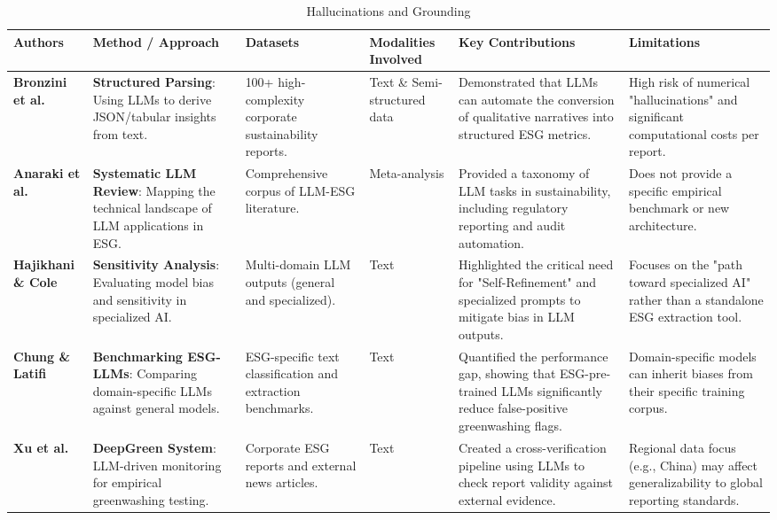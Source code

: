 \begin{landscape}
\begin{table}[p]
\centering
\caption{Hallucinations and Grounding}
\label{tab:hallucinations-grounding}
\small
\renewcommand{\arraystretch}{1.2}
\begin{tabularx}{\linewidth}{|p{1.8cm}|p{3.5cm}|p{3.5cm}|p{1.8cm}|X|X|}
\hline
Authors & Method / Approach & Datasets & Modalities Involved & Key Contributions & Limitations \\ \hline
\textbf{Bronzini et al.}  \parencite{marco_bronzini_bf94d949} & \textbf{Structured Parsing}: Using LLMs to derive JSON/tabular insights from text. & 100+ high-complexity corporate sustainability reports. & Text \& Semi-structured data & Demonstrated that LLMs can automate the conversion of qualitative narratives into structured ESG metrics. & High risk of numerical "hallucinations" and significant computational costs per report. \\ \hline
\textbf{Anaraki et al.}  \parencite{seyed_alireza_mousavian_anaraki_b56a1c0f} & \textbf{Systematic LLM Review}: Mapping the technical landscape of LLM applications in ESG. & Comprehensive corpus of LLM-ESG literature. & Meta-analysis & Provided a taxonomy of LLM tasks in sustainability, including regulatory reporting and audit automation. & Does not provide a specific empirical benchmark or new architecture. \\ \hline
\textbf{Hajikhani \& Cole}  \parencite{arash_hajikhani_cbb2528f} & \textbf{Sensitivity Analysis}: Evaluating model bias and sensitivity in specialized AI. & Multi-domain LLM outputs (general and specialized). & Text & Highlighted the critical need for "Self-Refinement" and specialized prompts to mitigate bias in LLM outputs. & Focuses on the "path toward specialized AI" rather than a standalone ESG extraction tool. \\ \hline
\textbf{Chung \& Latifi}  \parencite{tae_sun_chung_e16a4c18} & \textbf{Benchmarking ESG-LLMs}: Comparing domain-specific LLMs against general models. & ESG-specific text classification and extraction benchmarks. & Text & Quantified the performance gap, showing that ESG-pre-trained LLMs significantly reduce false-positive greenwashing flags. & Domain-specific models can inherit biases from their specific training corpus. \\ \hline
\textbf{Xu et al.}  \parencite{chong_xu_bff21576} & \textbf{DeepGreen System}: LLM-driven monitoring for empirical greenwashing testing. & Corporate ESG reports and external news articles. & Text & Created a cross-verification pipeline using LLMs to check report validity against external evidence. & Regional data focus (e.g., China) may affect generalizability to global reporting standards. \\ \hline

\end{tabularx}
\end{table}
\end{landscape}
